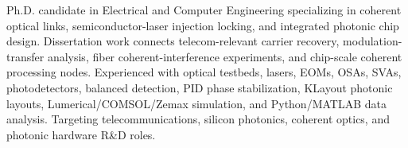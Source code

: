 
\begin{cvparagraph}
{Ph.D. candidate in Electrical and Computer Engineering specializing in coherent optical links, semiconductor-laser injection locking, and integrated photonic chip design. Dissertation work connects telecom-relevant carrier recovery, modulation-transfer analysis, fiber coherent-interference experiments, and chip-scale coherent processing nodes. Experienced with optical testbeds, lasers, EOMs, OSAs, SVAs, photodetectors, balanced detection, PID phase stabilization, KLayout photonic layouts, Lumerical/COMSOL/Zemax simulation, and Python/MATLAB data analysis. Targeting telecommunications, silicon photonics, coherent optics, and photonic hardware R\&D roles.}
\vspace{-0.45cm}
\end{cvparagraph}
